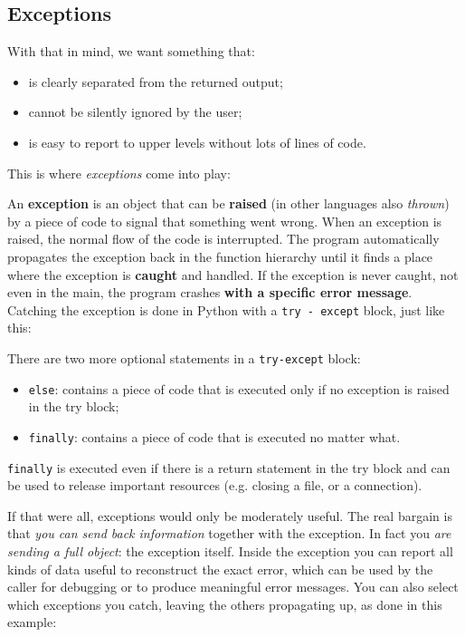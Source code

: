 \subsection{Exceptions}

With that in mind, we want something that:
\begin{itemize}
    \item[-] is clearly separated from the returned output;
    \item[-] cannot be silently ignored by the user;
    \item[-] is easy to report to upper levels without lots of lines of code.
\end{itemize}
This is where \textit{exceptions} come into play:



An \textbf{exception} is an object that can be \textbf{raised} (in other languages also \textit{thrown}) by a piece of code to signal that something went wrong. When an exception is raised, the normal flow of the code is interrupted. The program automatically propagates the exception back in the function hierarchy until it finds a place where the exception is \textbf{caught} and handled. If the exception is never caught, not even in the main, the program crashes \textbf{with a specific error message}. Catching the exception is done in Python with a \texttt{try - except} block, just like this:



There are two more optional statements in a \texttt{try-except} block:
\begin{itemize}
    \item[-] \texttt{else}: contains a piece of code that is executed only if no exception is raised in the try block;
    \item[-] \texttt{finally}: contains a piece of code that is executed no matter what.
\end{itemize}
\texttt{finally} is executed even if there is a return statement in the try block and can be used to release important resources (e.g. closing a file, or a connection).



If that were all, exceptions would only be moderately useful. The real bargain is that \textit{you can send back information} together with the exception. In fact you \textit{are sending a full object}: the exception itself. Inside the exception you can report all kinds of data useful to reconstruct the exact error, which can be used by the caller for debugging or to produce meaningful error messages. You can also select which exceptions you catch, leaving the others propagating up, as done in this example: 

